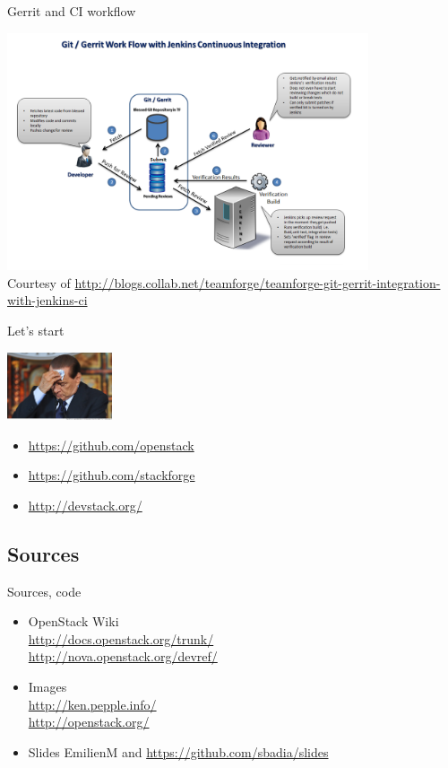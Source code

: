 \begin{frame}{Gerrit and CI workflow}
  \begin{center}
    \includegraphics[height=7cm]{img/Git_gerrit_jenkins.png}
    \\ \tiny Courtesy of \url{http://blogs.collab.net/teamforge/teamforge-git-gerrit-integration-with-jenkins-ci}
  \end{center}
\end{frame}

\begin{frame}{Let's start}
  \begin{center}
    \includegraphics[height=2cm]{img/silvio-berlusconi.jpg}
  \end{center}
  \begin{itemize}
    \item \url{https://github.com/openstack}
    \item \url{https://github.com/stackforge}
    \item \url{http://devstack.org/}
  \end{itemize}
\end{frame}

\subsection{Sources}
\begin{frame}{Sources, code}
\begin{itemize}
  \item OpenStack Wiki\\\url{http://docs.openstack.org/trunk/}\\\url{http://nova.openstack.org/devref/}
  \item Images\\\url{http://ken.pepple.info/}\\\url{http://openstack.org/}
  \item Slides EmilienM and \url{https://github.com/sbadia/slides}
\end{itemize}
\end{frame}

